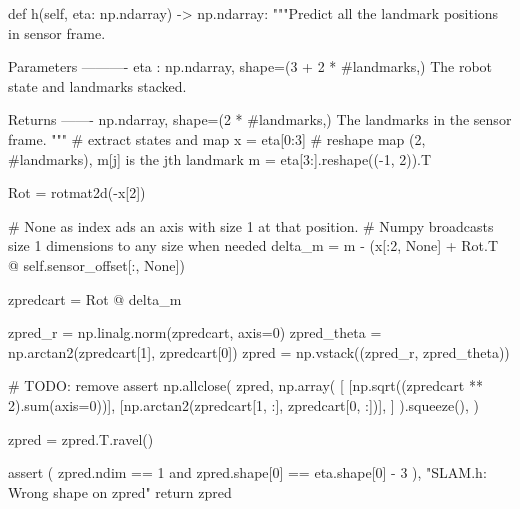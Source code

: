 \begin{pythoncode}
def h(self, eta: np.ndarray) -> np.ndarray:
    """Predict all the landmark positions in sensor frame.

    Parameters
    ----------
    eta : np.ndarray, shape=(3 + 2 * #landmarks,)
    The robot state and landmarks stacked.

    Returns
    -------
    np.ndarray, shape=(2 * #landmarks,)
    The landmarks in the sensor frame.
    """
    # extract states and map
    x = eta[0:3]
    # reshape map (2, #landmarks), m[j] is the jth landmark
    m = eta[3:].reshape((-1, 2)).T

    Rot = rotmat2d(-x[2])

    # None as index ads an axis with size 1 at that position.
    # Numpy broadcasts size 1 dimensions to any size when needed
    delta_m = m - (x[:2, None] + Rot.T @ self.sensor_offset[:, None])

    zpredcart = Rot @ delta_m

    zpred_r = np.linalg.norm(zpredcart, axis=0)
    zpred_theta = np.arctan2(zpredcart[1], zpredcart[0])
    zpred = np.vstack((zpred_r, zpred_theta))

    # TODO: remove
    assert np.allclose(
        zpred,
        np.array(
            [
                [np.sqrt((zpredcart ** 2).sum(axis=0))],
                [np.arctan2(zpredcart[1, :], zpredcart[0, :])],
            ]
        ).squeeze(),
    )

    zpred = zpred.T.ravel()

    assert (
        zpred.ndim == 1 and zpred.shape[0] == eta.shape[0] - 3
    ), "SLAM.h: Wrong shape on zpred"
    return zpred
\end{pythoncode}